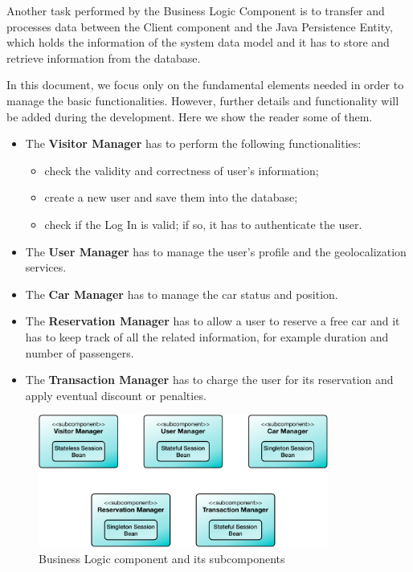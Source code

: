 Another task performed by the Business Logic Component is to transfer and processes data between the Client component and the Java Persistence Entity, which holds the information of the system data model and it has to store and retrieve information from the database.

In this document, we focus only on the fundamental elements needed in order to manage the basic functionalities. However, further details and functionality will be added during the development. Here we show the reader some of them.

\begin{itemize}
\item The \textbf{Visitor Manager} has to perform the following functionalities:
	\begin{itemize}
	\item check the validity and correctness of user's information;
	\item create a new user and save them into the database;
	\item check if the Log In is valid; if so, it has to authenticate the user.
	\end{itemize}
\item The \textbf{User Manager} has to manage the user's profile and the geolocalization services.
\item The \textbf{Car Manager} has to manage the car status and position.
\item The \textbf{Reservation Manager} has to allow a user to reserve a free car and it has to keep track of all the related information, for example duration and number of passengers.
\item The \textbf{Transaction Manager} has to charge the user for its reservation and apply eventual discount or penalties.
\end{itemize}
\clearpage

\begin{figure}[htbp]
\centering
\vspace{104pt}
\includegraphics[width=0.85\textwidth]{Images/BusinessLogicComponent.pdf}
\vspace{10pt}
\caption{Business Logic component and its subcomponents}
\label{fig:business}
\end{figure}
\clearpage

